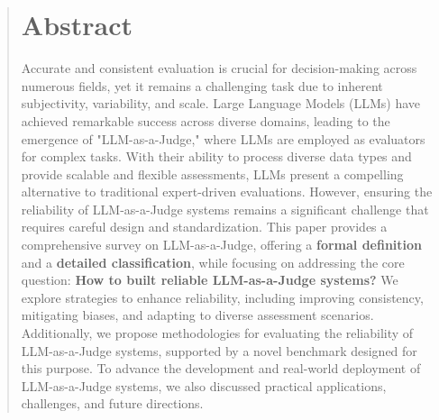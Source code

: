 \renewcommand{\shortauthors}{J. Gu, X. Jiang, Z. Shi, J. Guo, et al.}






\begin{abstract}\label{abstract}

\section*{Abstract}
Accurate and consistent evaluation is crucial for decision-making across numerous fields, yet it remains a challenging task due to inherent subjectivity, variability, and scale. 
Large Language Models (LLMs) have achieved remarkable success across diverse domains, leading to the emergence of "LLM-as-a-Judge," where LLMs are employed as evaluators for complex tasks. With their ability to process diverse data types and provide scalable and flexible assessments, LLMs present a compelling alternative to traditional expert-driven evaluations. 
However, ensuring the reliability of LLM-as-a-Judge systems remains a significant challenge that requires careful design and standardization. 
This paper provides a comprehensive survey on LLM-as-a-Judge, offering a \textbf{formal definition} and a \textbf{detailed classification}, while focusing on addressing the core question: \textbf{How to built reliable LLM-as-a-Judge systems?} We explore strategies to enhance reliability, including improving consistency, mitigating biases, and adapting to diverse assessment scenarios. Additionally, we propose methodologies for evaluating the reliability of LLM-as-a-Judge systems, supported by a novel benchmark designed for this purpose. 
To advance the development and real-world deployment of LLM-as-a-Judge systems, we also discussed practical applications, challenges, and future directions. 


\end{abstract}

